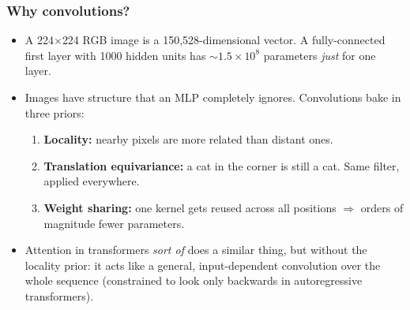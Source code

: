 \begin{frame}
\frametitle{Why convolutions?}
\begin{itemize}
    \item A 224$\times$224 RGB image is a 150{,}528-dimensional vector.
    A fully-connected first layer with 1000 hidden units has $\sim 1.5 \times 10^8$
    parameters \emph{just} for one layer.
    \pause
    \item Images have structure that an MLP completely ignores. Convolutions bake
    in three priors:
    \begin{enumerate}
        \item \textbf{Locality:} nearby pixels are more related than distant ones.
        \pause
        \item \textbf{Translation equivariance:} a cat in the corner is still a
        cat. Same filter, applied everywhere.
        \pause
        \item \textbf{Weight sharing:} one kernel gets reused across all positions
        $\Rightarrow$ orders of magnitude fewer parameters.
    \end{enumerate}
    \pause
    \item Attention in transformers \emph{sort of} does a similar thing, but without the locality prior: it acts like a general, input-dependent convolution over the whole sequence (constrained to look only backwards in autoregressive transformers).
\end{itemize}
\end{frame}

\begin{frame}
\begin{center}
\end{center}
\end{frame}

